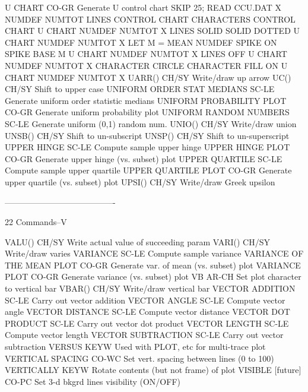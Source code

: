 U CHART                     CO-GR Generate U control chart
                                  SKIP 25; READ CCU.DAT X NUMDEF NUMTOT
                                  LINES CONTROL CHART
                                  CHARACTERS CONTROL CHART
                                  U CHART NUMDEF NUMTOT X
                                  LINES SOLID SOLID DOTTED
                                  U CHART NUMDEF NUMTOT X
                                  LET M = MEAN NUMDEF
                                  SPIKE ON
                                  SPIKE BASE M
                                  U CHART NUMDEF NUMTOT X
                                  LINES OFF
                                  U CHART NUMDEF NUMTOT X
                                  CHARACTER CIRCLE
                                  CHARACTER FILL ON
                                  U CHART NUMDEF NUMTOT X
UARR()                      CH/SY Write/draw up arrow
UC()                        CH/SY Shift to upper case
UNIFORM ORDER STAT MEDIANS  SC-LE Generate uniform order statistic medians
UNIFORM PROBABILITY PLOT    CO-GR Generate uniform probability plot
UNIFORM RANDOM NUMBERS      SC-LE Generate uniform (0,1) random num.
UNIO()                      CH/SY Write/draw union
UNSB()                      CH/SY Shift to un-subscript
UNSP()                      CH/SY Shift to un-superscript
UPPER HINGE                 SC-LE Compute sample upper hinge
UPPER HINGE PLOT            CO-GR Generate upper hinge (vs. subset) plot
UPPER QUARTILE              SC-LE Compute sample upper quartile
UPPER QUARTILE PLOT         CO-GR Generate upper quartile (vs. subset) plot
UPSI()                      CH/SY Write/draw Greek upsilon
 
----------------------------------------
 
22
Commands--V
 
VALU()                      CH/SY Write actual value of succeeding param
VARI()                      CH/SY Write/draw varies
VARIANCE                    SC-LE Compute sample variance
VARIANCE OF THE MEAN PLOT   CO-GR Generate var. of mean (vs. subset) plot
VARIANCE PLOT               CO-GR Generate variance (vs. subset) plot
VB                          AR-CH Set plot character to vertical bar
VBAR()                      CH/SY Write/draw vertical bar
VECTOR ADDITION             SC-LE Carry out vector addition
VECTOR ANGLE                SC-LE Compute vector angle
VECTOR DISTANCE             SC-LE Compute vector distance
VECTOR DOT PRODUCT          SC-LE Carry out vector dot product
VECTOR LENGTH               SC-LE Compute vector length
VECTOR SUBTRACTION          SC-LE Carry out vector subtraction
VERSUS                      KEYW  Used with PLOT, etc for multi-trace plot
VERTICAL SPACING            CO-WC Set vert. spacing between lines (0 to 100)
VERTICALLY                  KEYW  Rotate contents (but not frame) of plot
VISIBLE    [future]         CO-PC Set 3-d bkgrd lines visibility (ON/OFF)
 
